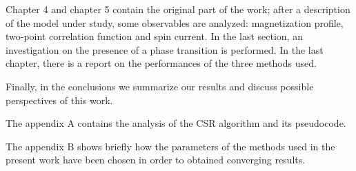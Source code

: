 Chapter 4 and chapter 5 contain the original part of the work; after a description of the model under study, some observables are analyzed: magnetization profile, two-point correlation function and spin current. In the last section, an investigation on the presence of a phase transition is performed. In the last chapter, there is a report on the performances of the three methods used.

Finally, in the conclusions we summarize our results and discuss possible perspectives of this work.

The appendix A contains the analysis of the CSR algorithm and its pseudocode.

The appendix B shows briefly how the parameters of the methods used in the present work have been chosen in order to obtained converging results.